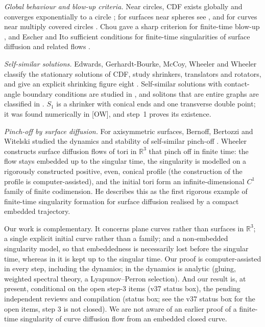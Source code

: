 \documentclass[11pt]{amsart}
\theoremstyle{definition}
\theoremstyle{remark}
\newcommand{\R}{\mathbb{R}}
\newcommand{\dref}[1]{[\textsf{#1}]}
\begin{document}
\emph{Global behaviour and blow-up criteria.} Near circles, CDF exists globally \cite{ElliottGarcke1997} and converges exponentially to a circle \cite{Wheeler2013}; for surfaces near spheres see \cite{EscherMayerSimonett1998,Wheeler2012}, and for curves near multiply covered circles \cite{MiuraOkabe2021}. Chou gave a sharp criterion for finite-time blow-up \cite{Chou2003}, and Escher and Ito sufficient conditions for finite-time singularities of surface diffusion and related flows \cite{EscherIto2005}.

\emph{Self-similar solutions.} Edwards, Gerhardt-Bourke, McCoy, Wheeler and Wheeler classify the stationary solutions of CDF, study shrinkers, translators and rotators, and give an explicit shrinking figure eight \cite{EGMWW2015}. Self-similar solutions with contact-angle boundary conditions are studied in \cite{AsaiGiga2014}, and solitons that are entire graphs are classified in \cite{RybkaWheeler2024}. $S_1$ is a shrinker with conical ends and one transverse double point; it was found numerically in \dref{OW}, and step~1 proves its existence.

\emph{Pinch-off by surface diffusion.} For axisymmetric surfaces, Bernoff, Bertozzi and Witelski studied the dynamics and stability of self-similar pinch-off \cite{BernoffBertozziWitelski1998}. Wheeler \cite{Wheeler2026} constructs surface diffusion flows of tori in $\R^3$ that pinch off in finite time: the flow stays embedded up to the singular time, the singularity is modelled on a rigorously constructed positive, even, conical profile (the construction of the profile is computer-assisted), and the initial tori form an infinite-dimensional $C^1$ family of finite codimension. He describes this as the first rigorous example of finite-time singularity formation for surface diffusion realised by a compact embedded trajectory.

Our work is complementary. It concerns plane curves rather than surfaces in $\R^3$; a single explicit initial curve rather than a family; and a non-embedded singularity model, so that embeddedness is necessarily lost before the singular time, whereas in \cite{Wheeler2026} it is kept up to the singular time. Our proof is computer-assisted in every step, including the dynamics; in \cite{Wheeler2026} the dynamics is analytic (gluing, weighted spectral theory, a Lyapunov--Perron selection). And our result is, at present, conditional on the open step-3 items (v37 status box), the pending independent reviews and compilation (status box; see the v37 status box for the open items, step 3 is not closed). We are not aware of an earlier proof of a finite-time singularity of curve diffusion flow from an embedded closed curve.
\end{document}
